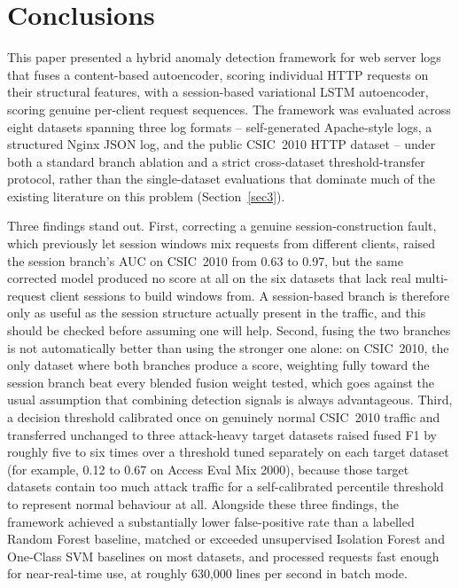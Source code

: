 \documentclass[futureinternet,article,submit,moreauthors]{Definitions/mdpi}
\begin{document}
\section{Conclusions} \label{sec7}

This paper presented a hybrid anomaly detection framework for web server logs that fuses a content-based autoencoder, scoring individual HTTP requests on their structural features, with a session-based variational LSTM autoencoder, scoring genuine per-client request sequences. The framework was evaluated across eight datasets spanning three log formats -- self-generated Apache-style logs, a structured Nginx JSON log, and the public CSIC~2010 HTTP dataset -- under both a standard branch ablation and a strict cross-dataset threshold-transfer protocol, rather than the single-dataset evaluations that dominate much of the existing literature on this problem (Section~\ref{sec3}).

Three findings stand out. First, correcting a genuine session-construction fault, which previously let session windows mix requests from different clients, raised the session branch's AUC on CSIC~2010 from 0.63 to 0.97, but the same corrected model produced no score at all on the six datasets that lack real multi-request client sessions to build windows from. A session-based branch is therefore only as useful as the session structure actually present in the traffic, and this should be checked before assuming one will help. Second, fusing the two branches is not automatically better than using the stronger one alone: on CSIC~2010, the only dataset where both branches produce a score, weighting fully toward the session branch beat every blended fusion weight tested, which goes against the usual assumption that combining detection signals is always advantageous. Third, a decision threshold calibrated once on genuinely normal CSIC~2010 traffic and transferred unchanged to three attack-heavy target datasets raised fused F1 by roughly five to six times over a threshold tuned separately on each target dataset (for example, 0.12 to 0.67 on Access Eval Mix 2000), because those target datasets contain too much attack traffic for a self-calibrated percentile threshold to represent normal behaviour at all. Alongside these three findings, the framework achieved a substantially lower false-positive rate than a labelled Random Forest baseline, matched or exceeded unsupervised Isolation Forest and One-Class SVM baselines on most datasets, and processed requests fast enough for near-real-time use, at roughly 630{,}000 lines per second in batch mode.
\end{document}
